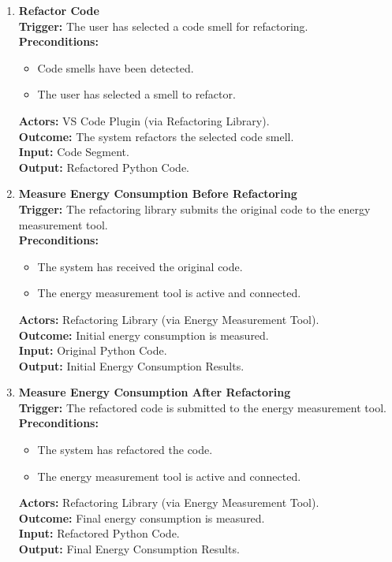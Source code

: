 \documentclass[12pt]{article}
\begin{document}
\begin{enumerate}[label={\bf PUC \arabic*:}, wide=0pt, font=\itshape]
  \item \textbf{Refactor Code} \\[2mm]
    \textbf{Trigger:} The user has selected a code smell for
    refactoring. \\[2mm]
    \textbf{Preconditions:}
    \begin{itemize}
      \item Code smells have been detected.
      \item The user has selected a smell to refactor.
    \end{itemize}
    \textbf{Actors:} VS Code Plugin (via Refactoring Library). \\
    \textbf{Outcome:} The system refactors the selected code smell. \\
    \textbf{Input:} Code Segment. \\
    \textbf{Output:} Refactored Python Code.

  \item \textbf{Measure Energy Consumption Before Refactoring} \\[2mm]
    \textbf{Trigger:} The refactoring library submits the original
    code to the energy measurement tool. \\[2mm]
    \textbf{Preconditions:}
    \begin{itemize}
      \item The system has received the original code.
      \item The energy measurement tool is active and connected.
    \end{itemize}
    \textbf{Actors:} Refactoring Library (via Energy Measurement Tool). \\
    \textbf{Outcome:} Initial energy consumption is measured. \\
    \textbf{Input:} Original Python Code. \\
    \textbf{Output:} Initial Energy Consumption Results.

  \item \textbf{Measure Energy Consumption After Refactoring} \\[2mm]
    \textbf{Trigger:} The refactored code is submitted to the energy
    measurement tool. \\[2mm]
    \textbf{Preconditions:}
    \begin{itemize}
      \item The system has refactored the code.
      \item The energy measurement tool is active and connected.
    \end{itemize}
    \textbf{Actors:} Refactoring Library (via Energy Measurement Tool). \\
    \textbf{Outcome:} Final energy consumption is measured. \\
    \textbf{Input:} Refactored Python Code. \\
    \textbf{Output:} Final Energy Consumption Results.


\end{enumerate}
\end{document}
